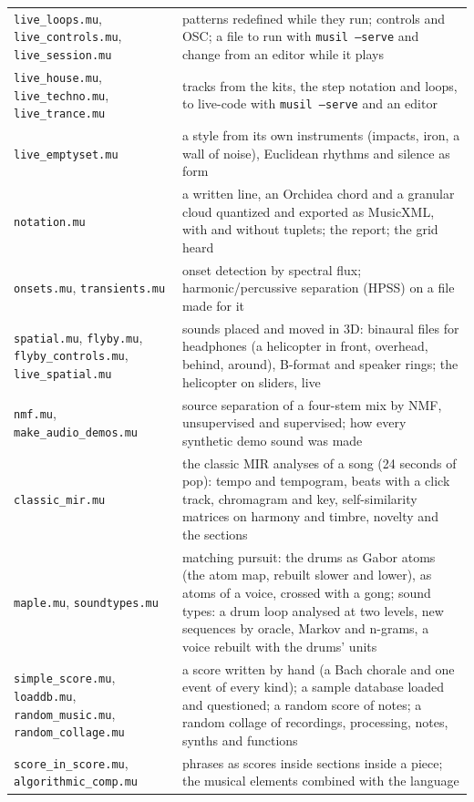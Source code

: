 \documentclass[11pt,a4paper]{article}
\begin{document}
\begin{center}
\begin{tabular}{@{}ll@{}}
\texttt{live\_loops.mu}, \texttt{live\_controls.mu}, \texttt{live\_session.mu} & patterns redefined while they run; controls and OSC; a file to run with \texttt{musil --serve} and change from an editor while it plays \\
\texttt{live\_house.mu}, \texttt{live\_techno.mu}, \texttt{live\_trance.mu} & tracks from the kits, the step notation and loops, to live-code with \texttt{musil --serve} and an editor \\
\texttt{live\_emptyset.mu} & a style from its own instruments (impacts, iron, a wall of noise), Euclidean rhythms and silence as form \\
\texttt{notation.mu} & a written line, an Orchidea chord and a granular cloud quantized and exported as MusicXML, with and without tuplets; the report; the grid heard \\
\texttt{onsets.mu}, \texttt{transients.mu} & onset detection by spectral flux; harmonic/percussive separation (HPSS) on a file made for it \\
\texttt{spatial.mu}, \texttt{flyby.mu}, \texttt{flyby\_controls.mu}, \texttt{live\_spatial.mu} & sounds placed and moved in 3D: binaural files for headphones (a helicopter in front, overhead, behind, around), B-format and speaker rings; the helicopter on sliders, live \\
\texttt{nmf.mu}, \texttt{make\_audio\_demos.mu} & source separation of a four-stem mix by NMF, unsupervised and supervised; how every synthetic demo sound was made \\
\texttt{classic\_mir.mu} & the classic MIR analyses of a song (24 seconds of pop): tempo and tempogram, beats with a click track, chromagram and key, self-similarity matrices on harmony and timbre, novelty and the sections \\
\texttt{maple.mu}, \texttt{soundtypes.mu} & matching pursuit: the drums as Gabor atoms (the atom map, rebuilt slower and lower), as atoms of a voice, crossed with a gong; sound types: a drum loop analysed at two levels, new sequences by oracle, Markov and n-grams, a voice rebuilt with the drums' units \\
\texttt{simple\_score.mu}, \texttt{loaddb.mu}, \texttt{random\_music.mu}, \texttt{random\_collage.mu} & a score written by hand (a Bach chorale and one event of every kind); a sample database loaded and questioned; a random score of notes; a random collage of recordings, processing, notes, synths and functions \\
\texttt{score\_in\_score.mu}, \texttt{algorithmic\_comp.mu} & phrases as scores inside sections inside a piece; the musical elements combined with the language \\

\end{tabular}
\end{center}
\end{document}
